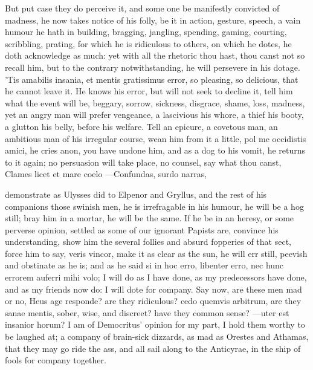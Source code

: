 {But put case they do perceive it, and some one be manifestly convicted
of madness, he now takes notice of his folly, be it in action,
gesture, speech, a vain humour he hath in building, bragging, jangling,
spending, gaming, courting, scribbling, prating, for which he is
ridiculous to others, on which he dotes, he doth acknowledge as
much: yet with all the rhetoric thou hast, thou canst not so recall
him, but to the contrary notwithstanding, he will persevere in his
dotage. 'Tis amabilis insania, et mentis gratissimus error, so
pleasing, so delicious, that he  cannot leave it. He knows his
error, but will not seek to decline it, tell him what the event will
be, beggary, sorrow, sickness, disgrace, shame, loss, madness, yet
an angry man will prefer vengeance, a lascivious his whore, a
thief his booty, a glutton his belly, before his welfare. Tell an
epicure, a covetous man, an ambitious man of his irregular course, wean
him from it a little, pol me occidistis amici, he cries anon, you have
undone him, and as a dog to his vomit, he returns to it again; no
persuasion will take place, no counsel, say what thou canst,
Clames licet et mare coelo
---Confundas, surdo narras,

demonstrate as Ulysses did to Elpenor and Gryllus, and the rest of
his companions those swinish men, he is irrefragable in his humour, he
will be a hog still; bray him in a mortar, he will be the same. If he
be in an heresy, or some perverse opinion, settled as some of our
ignorant Papists are, convince his understanding, show him the several
follies and absurd fopperies of that sect, force him to say, veris
vincor, make it as clear as the sun, he will err still, peevish
and obstinate as he is; and as he said si in hoc erro, libenter
erro, nec hunc errorem auferri mihi volo; I will do as I have done, as
my predecessors have done, and as my friends now do: I will dote
for company. Say now, are these men mad or no, Heus age
responde? are they ridiculous? cedo quemvis arbitrum, are they sanae
mentis, sober, wise, and discreet? have they common sense? ---uter
est insanior horum? I am of Democritus' opinion for my part, I hold
them worthy to be laughed at; a company of brain-sick dizzards, as mad
as Orestes and Athamas, that they may go ride the ass, and all
sail along to the Anticyrae, in the ship of fools for company together.

}
